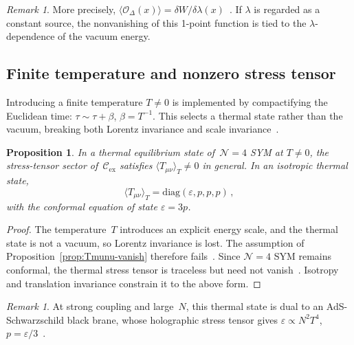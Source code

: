 \documentclass[
  aps,
  prd,
  preprint,
  groupedaddress,
  nofootinbib,
  longbibliography
]{revtex4-2}
\newtheorem{proposition}[definition]{Proposition}
\theoremstyle{remark}
\newtheorem{remark}[definition]{Remark}
\newcommand{\Cex}{\mathcal{C}_{\mathrm{ex}}}
\newcommand{\N}{\mathcal{N}}
\begin{document}
\begin{remark}\label{rem:relevant-W}
More precisely,
$\langle\mathcal{O}_\Delta(x)\rangle
= \delta W / \delta\lambda(x)$~\cite{ref2,ref3,ref5,ref9,ref10}.
If $\lambda$ is regarded as a constant source, the nonvanishing
of this 1-point function is tied to the $\lambda$-dependence
of the vacuum energy.
\end{remark}

\subsection{Finite temperature and nonzero stress tensor}%
  \label{subsec:3-3}

Introducing a finite temperature $T\neq 0$ is implemented by
compactifying the Euclidean time:
$\tau\sim\tau+\beta$, $\beta=T^{-1}$.
This selects a thermal state rather than the vacuum, breaking
both Lorentz invariance and scale invariance~\cite{ref4,ref7}.

\begin{proposition}\label{prop:finite-T}
In a thermal equilibrium state of~$\N=4$ SYM at $T\neq 0$,
the stress-tensor sector of~$\Cex$ satisfies
$\langle T_{\mu\nu}\rangle_T\neq 0$ in general.
In an isotropic thermal state,
\begin{equation}\label{eq:thermal-Tmunu}
  \langle T_{\mu\nu}\rangle_T
  = \mathrm{diag}(\varepsilon,p,p,p)\,,
\end{equation}
with the conformal equation of state
$\varepsilon = 3p$.
\end{proposition}

\begin{proof}
The temperature~$T$ introduces an explicit energy scale, and the
thermal state is not a vacuum, so Lorentz invariance is lost.
The assumption of Proposition~\ref{prop:Tmunu-vanish} therefore
fails~\cite{ref13,ref14}.
Since $\N=4$ SYM remains conformal, the thermal stress tensor
is traceless but need not
vanish~\cite{ref4,ref7}.
Isotropy and translation invariance constrain it to the above form.
\end{proof}

\begin{remark}\label{rem:AdS-Sch}
At strong coupling and large~$N$, this thermal state is dual
to an AdS-Schwarzschild black brane, whose holographic stress
tensor gives $\varepsilon\propto N^2 T^4$,
$p = \varepsilon/3$~\cite{ref3,ref4,ref12}.
\end{remark}
\end{document}
